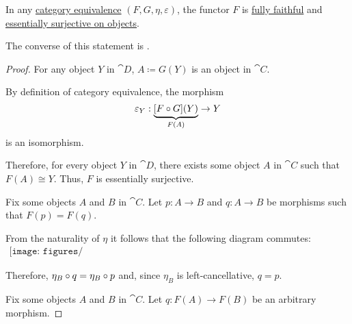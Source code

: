 \begin{proposition}\label{thm:category_equivalence_is_fully_faithful_and_essentially_surjective}
  In any \hyperref[def:category_equivalence]{category equivalence} \( (F, G, \eta, \varepsilon) \), the functor \( F \) is \hyperref[def:functor_invertibility/fully_faithful]{fully faithful} and \hyperref[def:functor_invertibility/surjective_on_objects]{essentially surjective on objects}.

  The converse of this statement is .
\end{proposition}
\begin{proof}
   For any object \( Y \) in \( \cat{D} \), \( A \coloneqq G(Y) \) is an object in \( \cat{C} \).

  By definition of category equivalence, the morphism
  \begin{equation*}
    \varepsilon_Y: \underbrace{[F \bincirc G](Y)}_{F(A)} \to Y
  \end{equation*}
  is an isomorphism.

  Therefore, for every object \( Y \) in \( \cat{D} \), there exists some object \( A \) in \( \cat{C} \) such that \( F(A) \cong Y \). Thus, \( F \) is essentially surjective.

   Fix some objects \( A \) and \( B \) in \( \cat{C} \). Let \( p: A \to B \) and \( q: A \to B \) be morphisms such that \( F(p) = F(q) \).

  From the naturality of \( \eta \) it follows that the following diagram commutes:
  \begin{equation}\label{eq:thm:category_equivalence_is_fully_faithful_and_essentially_surjective/faithfullness}
    \begin{aligned}
      \texttt{[image: figures/thm\_\_category\_equivalence\_is\_fully\_faithful\_and\_essentially\_surjective.pdf]}
    \end{aligned}
  \end{equation}

  Therefore, \( \eta_B \bincirc q = \eta_B \bincirc p \) and, since \( \eta_B \) is left-cancellative, \( q = p \).

   Fix some objects \( A \) and \( B \) in \( \cat{C} \). Let \( q: F(A) \to F(B) \) be an arbitrary morphism.


\end{proof}
